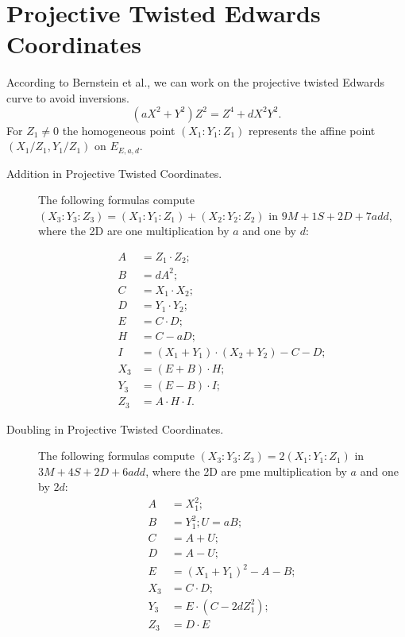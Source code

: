 \documentclass[a4paper]{article}
\begin{document}
\section{Projective Twisted Edwards Coordinates}
According to Bernstein et al.\cite{hisil2008twisted}, we can work on the projective twisted Edwards curve to avoid inversions.
$$(aX^2+Y^2)Z^2=Z^4+dX^2Y^2.$$
For $Z_1 \neq 0$ the homogeneous point $(X_1:Y_1:Z_1)$ represents the affine point $(X_1/Z_1,Y_1/Z_1)$ on $E_{E,a,d}$.
\begin{description}
\item[Addition in Projective Twisted Coordinates.]
The following formulas compute $(X_3:Y_3:Z_3)=(X_1:Y_1:Z_1)+(X_2:Y_2:Z_2)$ in $9M+1S+2D+7add$, where the 2D are one multiplication by $a$ and one by $d$:

\begin{align*}
A & =Z_1\cdot Z_2; \\
B & =dA^2;\\
C & =X_1\cdot X_2; \\
D & =Y_1\cdot Y_2; \\
E & =C\cdot D;\\
H & =C-aD;\\
I & =(X_1+Y_1)\cdot (X_2+Y_2)-C-D;\\
X_3 & =(E+B)\cdot H;\\
Y_3 & =(E-B)\cdot I;\\
Z_3 & =A\cdot H\cdot I.
\end{align*}

\end{description}

\begin{description}
\item[Doubling in Projective Twisted Coordinates.]
The following formulas compute $(X_3:Y_3:Z_3)=2(X_1:Y_1:Z_1)$ in $3M+4S+2D+6add$, where the 2D are pme multiplication by $a$ and one by $2d$:
\begin{align*}
    A & =X_1^2; \\
    B & =Y_1^2;U=aB;\\
    C & =A+U;\\
    D & =A-U;\\
    E & =(X_1+Y_1)^2-A-B;\\
    X_3 & =C\cdot D;\\
    Y_3 & =E\cdot (C-2dZ_1^2);\\
    Z_3 & =D\cdot E
\end{align*}

\end{description}
\end{document}

